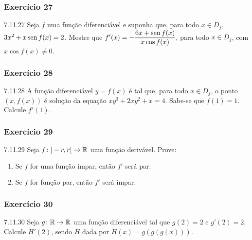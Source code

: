 \subsubsection*{Exercício 27}
\begin{exercicio}[27]{7.11.27}
Seja $f$ uma função diferenciável e suponha que, para todo $x \in D_f$, $3x^2 + x\operatorname{sen} f(x) = 2$. Mostre que $f'(x) = -\dfrac{6x + \operatorname{sen} f(x)}{x\cos f(x)}$, para todo $x \in D_f$, com $x\cos f(x) \neq 0$.
\end{exercicio}

\subsubsection*{Exercício 28}
\begin{exercicio}[28]{7.11.28}
A função diferenciável $y = f(x)$ é tal que, para todo $x \in D_f$, o ponto $(x, f(x))$ é solução da equação $xy^3 + 2xy^2 + x = 4$. Sabe-se que $f(1) = 1$. Calcule $f'(1)$.
\end{exercicio}

\subsubsection*{Exercício 29}
\begin{exercicio}[29]{7.11.29}
Seja $f\colon {]-r, r[} \to \mathbb{R}$ uma função derivável. Prove:
\begin{enumerate}[label=\alph*)]
    \item Se $f$ for uma função ímpar, então $f'$ será par.
    \item Se $f$ for função par, então $f'$ será ímpar.
\end{enumerate}
\end{exercicio}

\subsubsection*{Exercício 30}
\begin{exercicio}[30]{7.11.30}
Seja $g\colon \mathbb{R} \to \mathbb{R}$ uma função diferenciável tal que $g(2) = 2$ e $g'(2) = 2$. Calcule $H'(2)$, sendo $H$ dada por $H(x) = g(g(g(x)))$.
\end{exercicio}

\clearpage

